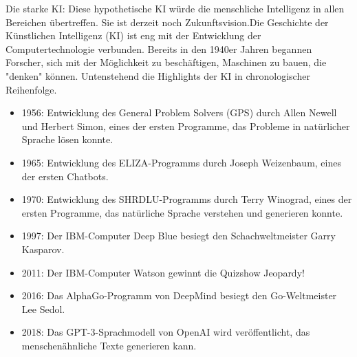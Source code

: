 \documentclass{article}
\begin{document}
Die starke KI: Diese hypothetische KI würde die menschliche Intelligenz in allen Bereichen übertreffen. Sie ist derzeit noch Zukunftsvision.Die Geschichte der Künstlichen Intelligenz (KI) ist eng mit der Entwicklung der Computertechnologie verbunden. Bereits in den 1940er Jahren begannen Forscher, sich mit der Möglichkeit zu beschäftigen, Maschinen zu bauen, die "denken" können. Untenstehend die Highlights der KI in chronologischer Reihenfolge.
\begin{itemize}
    \item 1956: Entwicklung des General Problem Solvers (GPS) durch Allen Newell und Herbert Simon, eines der ersten Programme, das Probleme in natürlicher Sprache lösen konnte.
    \item 1965: Entwicklung des ELIZA-Programms durch Joseph Weizenbaum, eines der ersten Chatbots.
    \item 1970: Entwicklung des SHRDLU-Programms durch Terry Winograd, eines der ersten Programme, das natürliche Sprache verstehen und generieren konnte.
    \item 1997: Der IBM-Computer Deep Blue besiegt den Schachweltmeister Garry Kasparov.
    \item 2011: Der IBM-Computer Watson gewinnt die Quizshow Jeopardy!
    \item 2016: Das AlphaGo-Programm von DeepMind besiegt den Go-Weltmeister Lee Sedol.
    \item 2018: Das GPT-3-Sprachmodell von OpenAI wird veröffentlicht, das menschenähnliche Texte generieren kann.
\end{itemize}
\end{document}
